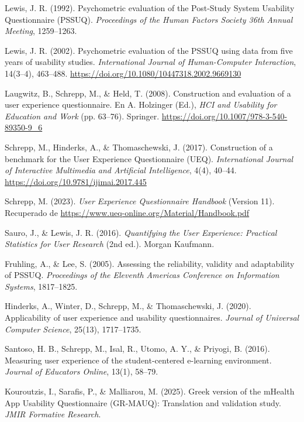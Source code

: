 \documentclass[a4paper,12pt]{report}
\begin{document}
\begin{enumerate}[label={[}\arabic{*}{]}]
    \item Lewis, J. R. (1992). Psychometric evaluation of the Post-Study System Usability Questionnaire (PSSUQ). \textit{Proceedings of the Human Factors Society 36th Annual Meeting}, 1259--1263.
    \item Lewis, J. R. (2002). Psychometric evaluation of the PSSUQ using data from five years of usability studies. \textit{International Journal of Human-Computer Interaction}, 14(3--4), 463--488. \url{https://doi.org/10.1080/10447318.2002.9669130}
    \item Laugwitz, B., Schrepp, M., \& Held, T. (2008). Construction and evaluation of a user experience questionnaire. En A. Holzinger (Ed.), \textit{HCI and Usability for Education and Work} (pp. 63--76). Springer. \url{https://doi.org/10.1007/978-3-540-89350-9_6}
    \item Schrepp, M., Hinderks, A., \& Thomaschewski, J. (2017). Construction of a benchmark for the User Experience Questionnaire (UEQ). \textit{International Journal of Interactive Multimedia and Artificial Intelligence}, 4(4), 40--44. \url{https://doi.org/10.9781/ijimai.2017.445}
    \item Schrepp, M. (2023). \textit{User Experience Questionnaire Handbook} (Version 11). Recuperado de \url{https://www.ueq-online.org/Material/Handbook.pdf}
    \item Sauro, J., \& Lewis, J. R. (2016). \textit{Quantifying the User Experience: Practical Statistics for User Research} (2nd ed.). Morgan Kaufmann.
    \item Fruhling, A., \& Lee, S. (2005). Assessing the reliability, validity and adaptability of PSSUQ. \textit{Proceedings of the Eleventh Americas Conference on Information Systems}, 1817--1825.
    \item Hinderks, A., Winter, D., Schrepp, M., \& Thomaschewski, J. (2020). Applicability of user experience and usability questionnaires. \textit{Journal of Universal Computer Science}, 25(13), 1717--1735.
    \item Santoso, H. B., Schrepp, M., Isal, R., Utomo, A. Y., \& Priyogi, B. (2016). Measuring user experience of the student-centered e-learning environment. \textit{Journal of Educators Online}, 13(1), 58--79.
    \item Kouroutzis, I., Sarafis, P., \& Malliarou, M. (2025). Greek version of the mHealth App Usability Questionnaire (GR-MAUQ): Translation and validation study. \textit{JMIR Formative Research}.

\end{enumerate}
\end{document}
